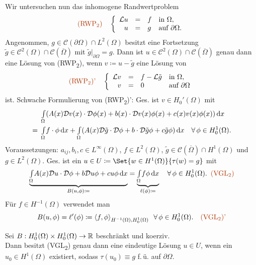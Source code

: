 \documentclass{cheat-sheet}
\newcommand{\Cont}{\mathcal{C}} %
\newcommand{\clos}[1]{\overline{#1}} %
\newcommand{\cOmega}{\clos{\Omega}} %
\newcommand{\bOmega}{\partial \Omega} %
\newcommand{\IntOmega}[2]{\AInt{\Omega}{#1}{#2}} %
\newcommand{\LL}{\mathcal{L}} %
\newcommand{\tss}[1]{\textsubscript{#1}} %
\newcommand{\DO}{\mathcal{D}} %
\newcommand{\scp}[2]{\left\langle #1 , #2 \right\rangle} %
\newcommand{\probl}[1]{\textcolor{ProblemColor}{#1}}
\begin{document}

\begin{prob}
  Wir untersuchen nun das inhomogene Randwertproblem
  \[
    \text{\probl{(RWP\tss{2})}} \quad
    \left\{ \begin{array}{r c l l}
      \LL u & = & f & \text{in } \Omega, \\
      u & = & g & \text{auf } \bOmega.
    \end{array} \right.
  \]
  Angenommen, $g \in \Cont(\bOmega) \cap L^2(\Omega)$ besitzt eine Fortsetzung $\tilde{g} \in \Cont^2(\Omega) \cap \Cont(\cOmega)$ mit $\tilde{g}|_{\bOmega} = g$.
  Dann ist $u \in \Cont^2(\Omega) \cap \Cont(\cOmega)$ genau dann eine Lösung von (RWP\tss{2}), wenn $v \coloneqq u - \tilde{g}$ eine Lösung von
  \[
    \text{\probl{(RWP\tss{2})'}} \quad
    \left\{ \begin{array}{r c l l}
      \LL v & = & f - \LL \tilde{g} & \text{in } \Omega, \\
      v & = & 0 & \text{auf } \bOmega
    \end{array} \right.
  \]
  ist.
  Schwache Formulierung von (RWP\tss{2})':
  Ges. ist $v \in H_0'(\Omega)$ mit
  \begin{align*}
    & \IntOmega{(A(x) \DO v(x) \cdot \DO \phi(x) + b(x) \cdot \DO v(x) \phi(x) + c(x) v(x) \phi(x))}{x} \\
    = \enspace & \IntOmega{f \cdot \phi}{x} + \IntOmega{(A(x) \DO \tilde{g} \cdot \DO \phi + b \cdot \DO \tilde{g} \phi + c \tilde{g} \phi)}{x} \quad
    \forall \, \phi \in H_0^1(\Omega).
  \end{align*}
  Voraussetzungen: $a_{ij}, b_i, c \in L^\infty(\Omega)$, $f \in L^2(\Omega)$, $\tilde{g} \in \Cont(\cOmega) \cap H^1(\Omega)$ und $g \in L^2(\Omega)$.
  Ges. ist ein $u \in U \coloneqq \Set{w \in H^1(\Omega)}{\tau(w) = g}$ mit
  \[
    \underbrace{\IntOmega{A(x) \DO u \cdot \DO \phi + b \DO u \phi + c u \phi}{x}}_{B(u, \phi) \coloneqq} =
    \underbrace{\IntOmega{f \phi}{x}}_{\ell(\phi) \coloneqq} \quad
    \forall \, \phi \in H_0^1(\Omega).
    \enspace \text{\probl{(VGL\tss{2})}}
  \]
  Für $f \in H^{-1}(\Omega)$ verwendet man
  \[
    B(u, \phi) = \ell'(\phi) \coloneqq \scp{f}{\phi}_{H^{-1}(\Omega), H_0^1(\Omega)} \enspace
    \forall \, \phi \in H_0^1(\Omega).
    \quad \text{\probl{(VGL\tss{2})'}}
  \]
\end{prob}

\begin{satz}
  Sei $B : H_0^1(\Omega) \times H_0^1(\Omega) \to \mathbb{R}$ beschränkt und koerziv. \\
  Dann besitzt (VGL\tss{2}) genau dann eine eindeutige Lösung $u \in U$, wenn ein $u_0 \in H^1(\Omega)$ existiert, sodass $\tau(u_0) \equiv g$ f.\,ü. auf $\bOmega$.
\end{satz}
\end{document}
